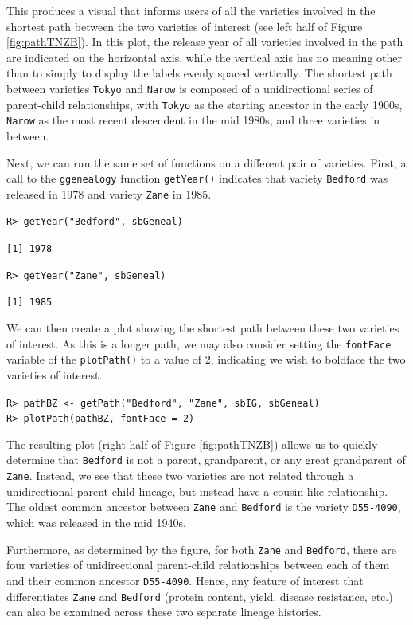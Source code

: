 \documentclass[11pt,a4paper,oldfontcommands,openany]{memoir}
\DeclareRobustCommand{\mybox}[2][gray!15]{%
\begin{tcolorbox}[   %
        breakable,
        left=0pt,
        right=0pt,
        top=0pt,
        bottom=0pt,
        colback=#1,
        colframe=#1,
        width=\dimexpr\textwidth\relax, 
        enlarge left by=0mm,
        boxsep=5pt,
        arc=0pt,outer arc=0pt,
        ]
        #2
\end{tcolorbox}
}
\numberwithin{equation}{section} %
\newcommand{\code}[1]{{\texttt{#1}}}
\newcommand{\pkg}[1]{{\texttt{#1}}}
\begin{document}
This produces a visual that informs users of all the varieties involved in the shortest path between the two varieties of interest (see left half of Figure \ref{fig:pathTNZB}). In this plot, the release year of all varieties involved in the path are indicated on the horizontal axis, while the vertical axis has no meaning other than to simply to display the labels evenly spaced vertically. The shortest path between varieties \code{Tokyo} and \code{Narow} is composed of a unidirectional series of parent-child relationships, with \code{Tokyo} as the starting ancestor in the early 1900s, \code{Narow} as the most recent descendent in the mid 1980s, and three varieties in between.

Next, we can run the same set of functions on a different pair of varieties. First, a call to the \pkg{ggenealogy} function \code{getYear()} indicates that variety \code{Bedford} was released in 1978 and variety \code{Zane} in 1985.

\mybox{
\texttt{R> getYear("Bedford", sbGeneal)}
}

\mybox[green!10]{
\texttt{[1] 1978}
}

\mybox{
\texttt{R> getYear("Zane", sbGeneal)}
}

\mybox[green!10]{
\texttt{[1] 1985}
}

We can then create a plot showing the shortest path between these two varieties of interest. As this is a longer path, we may also consider setting the \code{fontFace} variable of the \code{plotPath()} to a value of 2, indicating we wish to boldface the two varieties of interest.

\mybox{
\texttt{R> pathBZ <- getPath("Bedford", "Zane", sbIG, sbGeneal)}\\
\texttt{R> plotPath(pathBZ, fontFace = 2)}
}

The resulting plot (right half of Figure \ref{fig:pathTNZB}) allows us to quickly determine that \code{Bedford} is not a parent, grandparent, or any great grandparent of \code{Zane}. Instead, we see that these two varieties are not related through a unidirectional parent-child lineage, but instead have a cousin-like relationship. The oldest common ancestor between \code{Zane} and \code{Bedford} is the variety \code{D55-4090}, which was released in the mid 1940s.

Furthermore, as determined by the figure, for both \code{Zane} and \code{Bedford}, there are four varieties of unidirectional parent-child relationships between each of them and their common ancestor \code{D55-4090}. Hence, any feature of interest that differentiates \code{Zane} and \code{Bedford} (protein content, yield, disease resistance, etc.) can also be examined across these two separate lineage histories.
\end{document}
